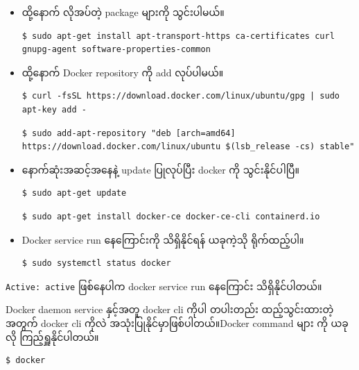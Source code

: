 \begin{itemize}
\item
  ထို့နောက် လိုအပ်တဲ့ package များကို သွင်းပါမယ်။

\begin{verbatim}
$ sudo apt-get install apt-transport-https ca-certificates curl gnupg-agent software-properties-common
\end{verbatim}
\item
  ထို့နောက် Docker repository ကို add လုပ်ပါမယ်။

\begin{verbatim}
$ curl -fsSL https://download.docker.com/linux/ubuntu/gpg | sudo apt-key add -
\end{verbatim}

\begin{verbatim}
$ sudo add-apt-repository "deb [arch=amd64] https://download.docker.com/linux/ubuntu $(lsb_release -cs) stable"
\end{verbatim}
\item
  နောက်ဆုံးအဆင့်အနေနဲ့ update ပြုလုပ်ပြီး docker ကို သွင်းနိုင်ပါပြီ။

\begin{verbatim}
$ sudo apt-get update
\end{verbatim}

\begin{verbatim}
$ sudo apt-get install docker-ce docker-ce-cli containerd.io
\end{verbatim}
\item
  Docker service run နေကြောင်းကို သိရှိနိုင်ရန် ယခုကဲ့သို ရိုက်ထည့်ပါ။

\begin{verbatim}
$ sudo systemctl status docker
\end{verbatim}
\end{itemize}

\texttt{Active:\ active} ဖြစ်နေပါက docker service run နေကြောင်း
သိရှိနိုင်ပါတယ်။

Docker daemon service နှင့်အတူ docker cli ကိုပါ တပါးတည်း ထည့်သွင်းထားတဲ့
အတွက် docker cli ကိုလဲ အသုံးပြုနိုင်မှာဖြစ်ပါတယ်။Docker command များ ကို
ယခုလို ကြည့်ရှူနိုင်ပါတယ်။

\begin{verbatim}
$ docker
\end{verbatim}

